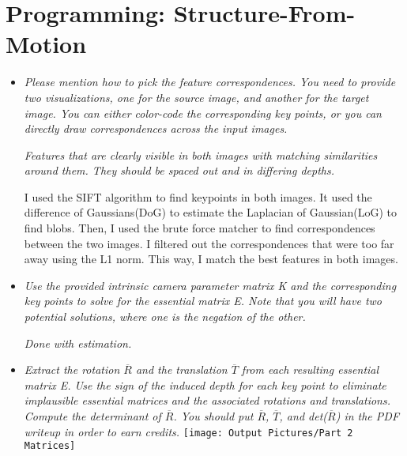 \documentclass[11pt]{article}
\begin{document}
    \section{Programming: Structure-From-Motion}

    \begin{itemize}
        \item \textit{Please mention how to pick the feature correspondences. You need to provide two visualizations,
            one for the source image, and another for the target image. You can either color-code the corresponding
            key points, or you can directly draw correspondences across the input images.}
        \par
        \textit{\textemdash Features that are clearly visible in both images with matching similarities around them.
        They should be spaced out and in differing depths.}
        \par
        I used the SIFT algorithm to find keypoints in both images. It used the difference of Gaussians(DoG) to estimate
        the Laplacian of Gaussian(LoG) to find blobs. Then, I used the brute force matcher to find
        correspondences between the two images. I filtered out the correspondences that were too far away using
        the L1 norm. This way, I match the best features in both images.\newline

        \item \textit{Use the provided intrinsic camera parameter matrix K and the corresponding key points to solve
        for the essential matrix E. Note that you will have two potential solutions, where one is the negation of the
        other.}
        \par
        \textit{\textemdash Done with estimation.}
        \par

        \item \textit{Extract the rotation $\overline{R}$ and the translation $\overline{T}$ from each resulting
        essential matrix E. Use the sign of the induced depth for each key point to eliminate implausible essential
        matrices and the associated rotations and translations. Compute the determinant of $\overline{R}$. You should
        put $\overline{R}$, $\overline{T}$, and det($\overline{R}$) in
        the PDF writeup in order to earn credits.}\newline
        \texttt{[image: Output Pictures/Part 2 Matrices]}\newline


\end{itemize}
\end{document}
